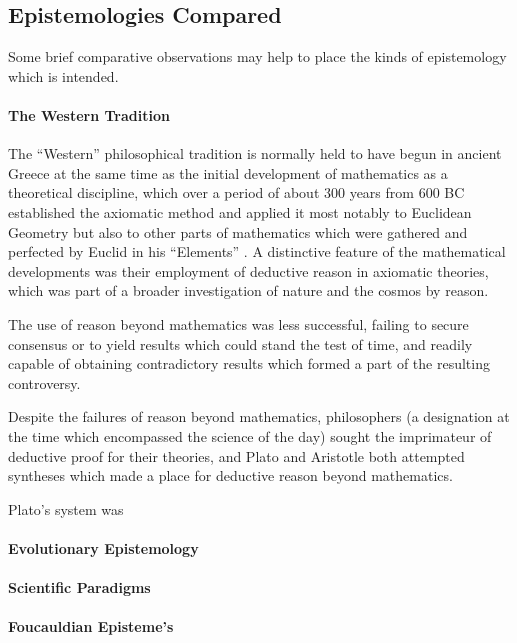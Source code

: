 \documentclass[10pt,titlepage]{book}
\begin{document}
\subsection{Epistemologies Compared}

Some brief comparative observations may help to place the kinds of epistemology which is intended.

\paragraph{The Western Tradition}

The ``Western'' philosophical tradition is normally held to have begun in ancient Greece at the same time as the initial development of mathematics as a theoretical discipline, which over a period of about 300 years from 600 BC established the axiomatic method and applied it most notably to Euclidean Geometry but also to other parts of mathematics which were gathered and perfected by Euclid in his ``Elements'' \cite{euclidL1}.
A distinctive feature of the mathematical developments was their employment of deductive reason in axiomatic theories, which was part of a broader investigation of nature and the cosmos by reason.

The use of reason beyond mathematics was less successful, failing to secure consensus or to yield results which could stand the test of time, and readily capable of obtaining contradictory results which formed a part of the resulting controversy.

Despite the failures of reason beyond mathematics, philosophers (a designation at the time which encompassed the science of the day) sought the imprimateur of deductive proof for their theories, and Plato and Aristotle both attempted syntheses which made a place for deductive reason beyond mathematics.

Plato's system was 



\paragraph{Evolutionary Epistemology}

\paragraph{Scientific Paradigms}

\paragraph{Foucauldian Episteme's}
\end{document}
